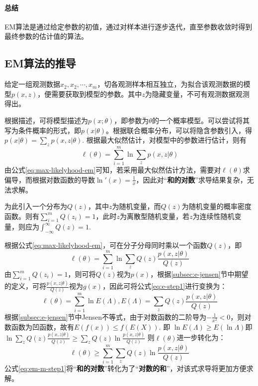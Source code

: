\documentclass[12pt,a4paper]{article}
\begin{document}
  \paragraph{总结} EM算法是通过给定参数的初值，通过对样本进行逐步迭代，直至参数收敛时得到最终参数的估计值的算法。

  \subsection{EM算法的推导}
  给定一组观测数据$x_2,x_2,\cdots, x_m$，切各观测样本相互独立，为拟合该观测数据的模型$p(x,z)$，便需要获取到模型的参数。其中$z$为隐藏变量，不可有观测数据观测得出。

  根据描述，可将模型描述为$p(x;\theta)$，即参数为$\theta$的一个概率模型。可以尝试将其写为条件概率的形式，即$p(x|\theta)$。根据联合概率分布，可以将隐含参数引入，得$p(x|\theta)=\sum\limits_zp(x,z|\theta)$. 根据最大似然估计，对模型中的参数进行估计，则有
  \begin{equation}
    \ell(\theta) = \sum_{i=1}^m \ln \sum\limits_zp(x,z|\theta)
    \label{eq:max-likelyhood-em}
  \end{equation}
  由公式\ref{eq:max-likelyhood-em}可知，若采用最大似然估计方法，需要对$\ell (\theta)$求偏导，而根据对数函数的导数$\ln '(x) = \frac{1}{x}$，因此对“\textbf{和的对数}”求导结果复杂，无法求解。

  为此引入一个分布为$Q(z)$，其中$z$为随机变量，而$Q(z)$为随机变量的概率密度函数。则有$\sum\limits_{i=1}^m Q(z_i) = 1$，此时$z$为离散型随机变量，若$z$为连续性随机变量，则应为$\int_{-\infty}^{\infty} Q(z) = 1$. 
  
  根据公式\ref{eq:max-likelyhood-em}，可在分子分母同时乘以一个函数$Q(z)$，即
  \begin{equation}
    \ell(\theta) = \sum_{i=1}^m \ln \sum_z Q(z) \frac{p(x,z|\theta)}{Q(z)}
    \label{eq:e-step1}
  \end{equation}
  由$\sum\limits_{i=1}^m Q(z_i) = 1$，则可将$Q(z)$视为$p(x)$，根据\ref{subsec:e-jensen}节中期望的定义，可将$\frac{p(x,z|\theta)}{Q(z)}$视为$g(x)$，因此可将公式\ref{eq:e-step1}进行变换为：
  \begin{equation}
    \ell (\theta) = \sum_{i=1}^m \ln E(\Lambda), E(\Lambda) = \sum_z Q(z) \frac{p(x,z|\theta)}{Q(z)}
  \end{equation}
  根据\ref{subsec:e-jensen}节中Jensen不等式，由于对数函数的二阶导为$-\frac{1}{x^2} < 0$，则对数函数为凹函数，故有$E(f(x)) \leq f(E(X))$. 即 $\ln E(\Lambda) \geq E(\ln \Lambda) $即$\ln \sum\limits_z Q(z) \frac{p(x,z|\theta)}{Q(z)} \geq \sum\limits_z Q(z) \ln \frac{p(x,z|\theta)}{Q(z)} $
  则$\ell (\theta)$进一步转化为：
  \begin{equation}
    \ell(\theta) \geq \sum _{i=1} ^m \sum _z Q(z) \ln \frac{p(x,z|\theta)}{Q(z)}
    \label{eq:em-m-step1}
  \end{equation}
  公式\ref{eq:em-m-step1}将“\textbf{和的对数}”转化为了“\textbf{对数的和}”，对该式求导将更加方便求解。
\end{document}
